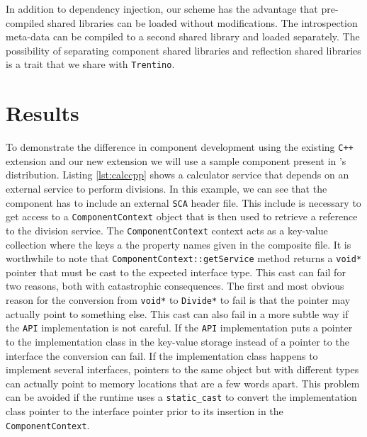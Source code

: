 In addition to dependency injection, our scheme has the advantage that pre-compiled shared libraries can be loaded without
modifications. The introspection meta-data can be compiled to a second shared library and loaded separately.
The possibility of separating component shared libraries and reflection shared libraries is a trait that we share with
\texttt{Trentino}.

\section{Results}

To demonstrate the difference in component development using the existing \texttt{C++} extension and our
new extension we will use a sample component present in 's distribution. Listing
\ref{lst:calccpp} shows a calculator service that depends on an external service to perform
divisions. In this example, we can see that the component has to include an external \texttt{SCA} header
file. This include is necessary to get access to a \texttt{ComponentContext} object that is then
used to retrieve a reference to the division service. The \texttt{ComponentContext} context acts
as a key-value collection where the keys a the property names given in the composite file.
It is worthwhile to note that \texttt{ComponentContext::getService} method returns a \texttt{void*}
pointer that must be cast to the expected interface type. This cast can fail for two reasons, both
with catastrophic consequences. The first and most obvious reason for the conversion from \texttt{void*} to
\texttt{Divide*} to fail is that the pointer may actually point to something else.
This cast can also fail in a more subtle way if the \texttt{API} implementation is not careful. If the
\texttt{API} implementation puts a pointer to the implementation class in the key-value storage instead of
a pointer to the interface the conversion can fail. If the implementation class happens to
implement several interfaces, pointers to the same object but with different types can actually
point to memory locations that are a few words apart. This problem can be avoided if the runtime
uses a \texttt{static\_cast} to convert the implementation class pointer to the interface pointer
prior to its insertion in the \texttt{ComponentContext}.

